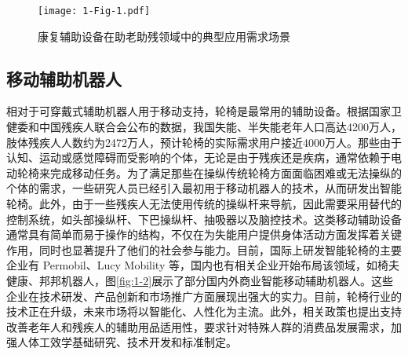 \begin{figure}[htb]
  \centering
  \texttt{[image: 1-Fig-1.pdf]}
  \caption{康复辅助设备在助老助残领域中的典型应用需求场景}
  \label{fig:1-1}
\end{figure}

\subsection{移动辅助机器人}
相对于可穿戴式辅助机器人用于移动支持，轮椅是最常用的辅助设备\cite{worldhealthorganizationGuidelinesProvisionManual2008b}。根据国家卫健委和中国残疾人联合会公布的数据，我国失能、半失能老年人口高达4200万人，肢体残疾人人数约为2472万人，预计轮椅的实际需求用户接近4000万人。那些由于认知、运动或感觉障碍而受影响的个体，无论是由于残疾还是疾病，通常依赖于电动轮椅来完成移动任务。为了满足那些在操纵传统轮椅方面面临困难或无法操纵的个体的需求，一些研究人员已经引入最初用于移动机器人的技术，从而研发出智能轮椅。此外，由于一些残疾人无法使用传统的操纵杆来导航，因此需要采用替代的控制系统，如头部操纵杆、下巴操纵杆、抽吸器以及脑控技术\cite{kimLiteratureReviewSmart2023,carringtonWearablesChairablesInclusive2014,rulikControlWheelchairMounted6DOF2022}。这类移动辅助设备通常具有简单而易于操作的结构，不仅在为失能用户提供身体活动方面发挥着关键作用，同时也显著提升了他们的社会参与能力。目前，国际上研发智能轮椅的主要企业有 Permobil、Lucy Mobility 等，国内也有相关企业开始布局该领域，如椅夫健康、邦邦机器人，图\ref{fig:1-2}展示了部分国内外商业智能移动辅助机器人。这些企业在技术研发、产品创新和市场推广方面展现出强大的实力。目前，轮椅行业的技术正在升级，未来市场将以智能化、人性化为主流。此外，相关政策也提出支持改善老年人和残疾人的辅助用品适用性，要求针对特殊人群的消费品发展需求，加强人体工效学基础研究、技术开发和标准制定。

